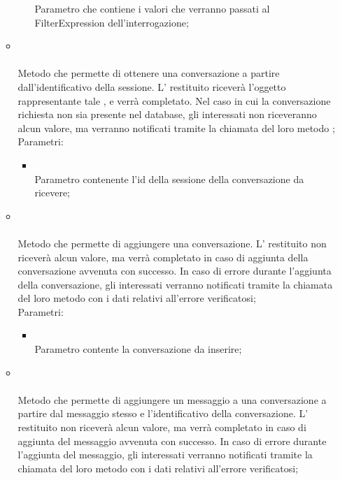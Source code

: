 \begin{itemize}
\begin{itemize}
\begin{itemize}
			Parametro che contiene i valori che verranno passati al FilterExpression dell'interrogazione;
		\end{itemize}
		\item[]  \\\\		Metodo che permette di ottenere una conversazione a partire dall'identificativo della sessione. L' restituito riceverà l'oggetto rappresentante tale , e verrà completato. Nel caso in cui la conversazione richiesta non sia presente nel database, gli  interessati non riceveranno alcun valore, ma verranno notificati tramite la chiamata del loro metodo ;\\
		Parametri:
		\begin{itemize}
			\item {} \\
			Parametro contenente l'id della sessione della conversazione da ricevere;
		\end{itemize}
		\item[]  \\\\		Metodo che permette di aggiungere una conversazione. L' restituito non riceverà alcun valore, ma verrà completato in caso di aggiunta della conversazione avvenuta con successo. In caso di errore durante l'aggiunta della conversazione, gli  interessati verranno notificati tramite la chiamata del loro metodo  con i dati relativi all'errore verificatosi;\\
		Parametri:
		\begin{itemize}
			\item {} \\
			Parametro contente la conversazione da inserire;
		\end{itemize}
		\item[] \\ \\		Metodo che permette di aggiungere un messaggio a una conversazione a partire dal messaggio stesso e l'identificativo della conversazione. L' restituito non riceverà alcun valore, ma verrà completato in caso di aggiunta del messaggio avvenuta con successo. In caso di errore durante l'aggiunta del messaggio, gli  interessati verranno notificati tramite la chiamata del loro metodo  con i dati relativi all'errore verificatosi;\\

\end{itemize}
\end{itemize}
